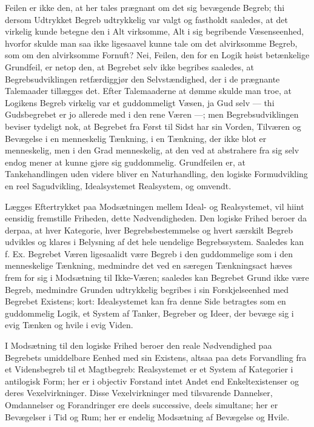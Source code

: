 \documentclass[11pt]{book}
\newcommand{\opage}[1]{\marginnote{\footnotesize\textit{[#1]}}}
\begin{document}
Feilen er ikke den, at her tales prægnant om det sig bevægende Begreb;
thi dersom Udtrykket Begreb udtrykkelig var valgt og fastholdt saaledes,
at det virkelig kunde betegne den i Alt virksomme, Alt i sig begribende
Væsenseenhed, hvorfor skulde man saa ikke ligesaavel kunne tale om det
alvirksomme Begreb, som om den alvirksomme Fornuft? Nei, Feilen, den for
en Logik høist betænkelige Grundfeil, er netop
\opage{227} \setcounter{footnote}{0}%
den, at Begrebet selv ikke begribes saaledes, at Begrebsudviklingen
retfærdiggjør den Selvstændighed, der i de prægnante Talemaader tillægges
det. Efter Talemaaderne at dømme skulde man troe, at Logikens Begreb
virkelig var et guddommeligt Væsen, ja Gud selv --- thi Gudsbegrebet er
jo allerede med i den rene Væren ---; men Begrebsudviklingen beviser
tydeligt nok, at Begrebet fra Først til Sidst har sin Vorden, Tilværen og
Bevægelse i en menneskelig Tænkning, i en Tænkning, der ikke blot er
menneskelig, men i den Grad menneskelig, at den ved at abstrahere fra sig
selv endog mener at kunne gjøre sig guddommelig. Grundfeilen er, at
Tankehandlingen uden videre bliver en Naturhandling, den logiske
Formudvikling en reel Sagudvikling, Idealsystemet Realsystem, og omvendt.

Lægges Eftertrykket paa Modsætningen mellem Ideal- og Realsystemet, vil
hiint eensidig fremstille Friheden, dette Nødvendigheden. Den logiske
Frihed beroer da derpaa, at hver Kategorie, hver Begrebsbestemmelse og
hvert særskilt Begreb udvikles og klares i Belysning af det hele
uendelige Begrebssystem. Saaledes kan f. Ex. Begrebet Væren ligesaalidt
være Begreb i den guddommelige som i den menneskelige Tænkning,
medmindre det ved en særegen Tænkningsact hæves frem for sig i
Modsætning til Ikke-Væren; saaledes kan Begrebet Grund ikke være Begreb,
medmindre Grunden udtrykkelig begribes i sin Forskjelseenhed med Begrebet
Existens; kort: Idealsystemet kan fra denne Side betragtes som en
guddommelig Logik, et System af Tanker, Begreber og Ideer, der bevæge sig
i evig Tænken og hvile i evig Viden.

I Modsætning til den logiske Frihed beroer den reale Nødvendighed paa
Begrebets umiddelbare Eenhed med sin Existens, altsaa paa dets
Forvandling fra et Vidensbegreb til et Magtbegreb: Realsystemet er et
System af Kategorier i antilogisk Form; her er i objectiv Forstand intet
Andet end
\opage{228} \setcounter{footnote}{0}%
Enkeltexistenser og deres Vexelvirkninger. Disse Vexelvirkninger med
tilsvarende Dannelser, Omdannelser og Forandringer ere deels successive,
deels simultane; her er Bevægelser i Tid og Rum; her er endelig
Modsætning af Bevægelse og Hvile.
\end{document}
